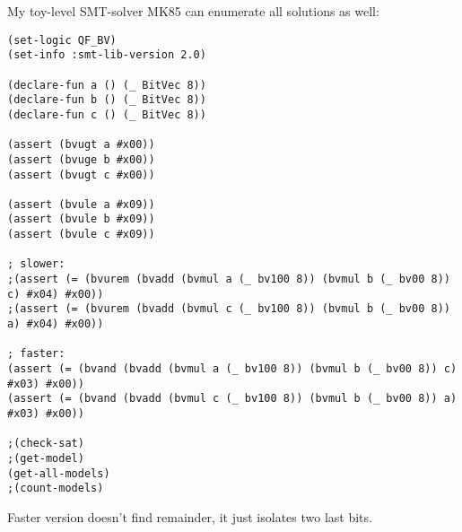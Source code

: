 My toy-level SMT-solver MK85 can enumerate all solutions as well:

\begin{lstlisting}
(set-logic QF_BV)
(set-info :smt-lib-version 2.0)

(declare-fun a () (_ BitVec 8))
(declare-fun b () (_ BitVec 8))
(declare-fun c () (_ BitVec 8))

(assert (bvugt a #x00))
(assert (bvuge b #x00))
(assert (bvugt c #x00))

(assert (bvule a #x09))
(assert (bvule b #x09))
(assert (bvule c #x09))

; slower:
;(assert (= (bvurem (bvadd (bvmul a (_ bv100 8)) (bvmul b (_ bv00 8)) c) #x04) #x00))
;(assert (= (bvurem (bvadd (bvmul c (_ bv100 8)) (bvmul b (_ bv00 8)) a) #x04) #x00))

; faster:
(assert (= (bvand (bvadd (bvmul a (_ bv100 8)) (bvmul b (_ bv00 8)) c) #x03) #x00))
(assert (= (bvand (bvadd (bvmul c (_ bv100 8)) (bvmul b (_ bv00 8)) a) #x03) #x00))

;(check-sat)
;(get-model)
(get-all-models)
;(count-models)
\end{lstlisting}

Faster version doesn't find remainder, it just isolates two last bits.

